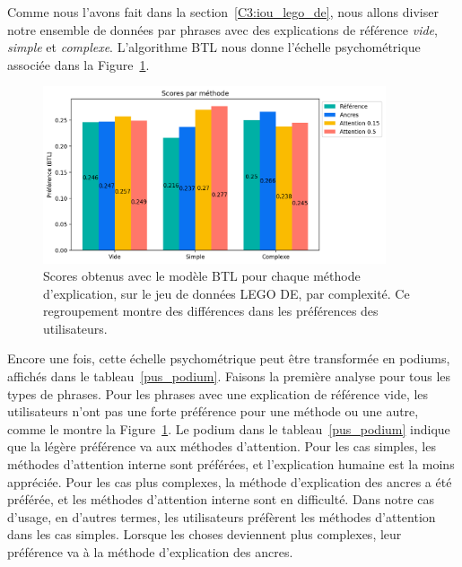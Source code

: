 Comme nous l'avons fait dans la section~\ref{C3:iou_lego_de}, nous allons diviser notre ensemble de données par phrases avec des explications de référence \textit{vide}, \textit{simple} et \textit{complexe}. L'algorithme BTL nous donne l'échelle psychométrique associée dans la Figure~\ref{fig:btl_plot_cplx}.

\begin{figure}[h!tpb]
  \setlength{\belowcaptionskip}{-20pt}
 \begin{center}
  \includegraphics[width=0.9\textwidth]{S3-Comparaison_de_methodes/figures/btl_by_complexity.png}
  \caption{Scores obtenus avec le modèle BTL pour chaque méthode d'explication, sur le jeu de données LEGO DE, par complexité. Ce regroupement montre des différences dans les préférences des utilisateurs. }\label{fig:btl_plot_cplx}
 \end{center}
\end{figure}

Encore une fois, cette échelle psychométrique peut être transformée en podiums, affichés dans le tableau~\ref{pus_podium}. Faisons la première analyse pour tous les types de phrases. Pour les phrases avec une explication de référence vide, les utilisateurs n'ont pas une forte préférence pour une méthode ou une autre, comme le montre la Figure~\ref{fig:btl_plot_cplx}. Le podium dans le tableau~\ref{pus_podium} indique que la légère préférence va aux méthodes d'attention.
Pour les cas simples, les méthodes d'attention interne sont préférées, et l'explication humaine est la moins appréciée. Pour les cas plus complexes, la méthode d'explication des ancres a été préférée, et les méthodes d'attention interne sont en difficulté. Dans notre cas d'usage, en d'autres termes, les utilisateurs préfèrent les méthodes d'attention dans les cas simples. Lorsque les choses deviennent plus complexes, leur préférence va à la méthode d'explication des ancres.

